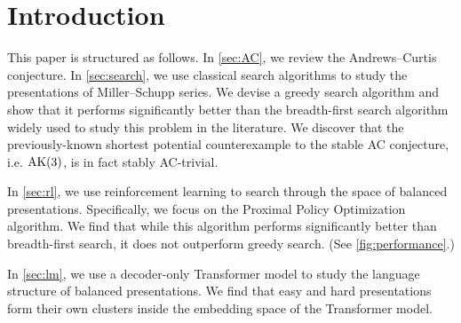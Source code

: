 
\section{Introduction\label{sec:intro}}

This paper is structured as follows. In \autoref{sec:AC}, we review the Andrews--Curtis conjecture. In \autoref{sec:search}, we use classical search algorithms to study the presentations of Miller--Schupp series. We devise a greedy search algorithm and show that it performs significantly better than the breadth-first search algorithm widely used to study this problem in the literature. We discover that the previously-known shortest potential counterexample to the stable AC conjecture, i.e. $\text{AK}(3)$, is in fact stably AC-trivial.
\newline

In \autoref{sec:rl}, we use reinforcement learning to search through the space of balanced presentations. Specifically, we focus on the Proximal Policy Optimization algorithm. We find that while this algorithm performs significantly better than breadth-first search, it does not outperform greedy search. (See \autoref{fig:performance}.)
\newline

In \autoref{sec:lm}, we use a decoder-only Transformer model to study the language structure of balanced presentations. We find that easy and hard presentations form their own clusters inside the embedding space of the Transformer model.

